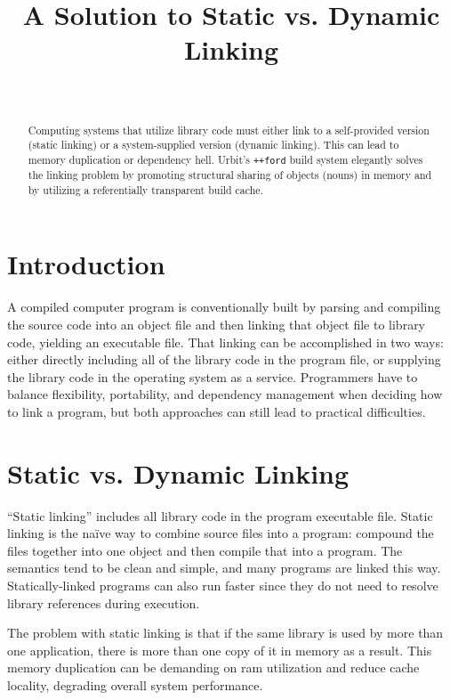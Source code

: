 \documentclass[twoside]{article}
\title{A Solution to Static vs. Dynamic Linking}
\author{\authorname~\authorpatp \\ \affiliation}
\date{}
\begin{document}
\maketitle
\thispagestyle{firststyle}

\begin{abstract}
\noindent
Computing systems that utilize library code must either link to a self-provided version (static linking) or a system-supplied version (dynamic linking).  This can lead to memory duplication or dependency hell.  Urbit's \lstinline[style=inlinecode]{++ford} build system elegantly solves the linking problem by promoting structural sharing of objects (nouns) in memory and by utilizing a referentially transparent build cache.
\end{abstract}

\setcounter{page}{75}

\tableofcontents

\section{Introduction}

A compiled computer program is conventionally built by parsing and compiling the source code into an object file and then linking that object file to library code, yielding an executable file.  That linking can be accomplished in two ways:  either directly including all of the library code in the program file, or supplying the library code in the operating system as a service.  Programmers have to balance flexibility, portability, and dependency management when deciding how to link a program, but both approaches can still lead to practical difficulties.

\section{Static vs. Dynamic Linking}

“Static linking” includes all library code in the program executable file.  Static linking is the naïve way to combine source files into a program:  compound the files together into one object and then compile that into a program.  The semantics tend to be clean and simple, and many programs are linked this way.  Statically-linked programs can also run faster since they do not need to resolve library references during execution.

The problem with static linking is that if the same library is used by more than one application, there is more than one copy of it in memory as a result.  This memory duplication can be demanding on {\sc ram} utilization and reduce cache locality, degrading overall system performance.
\end{document}
